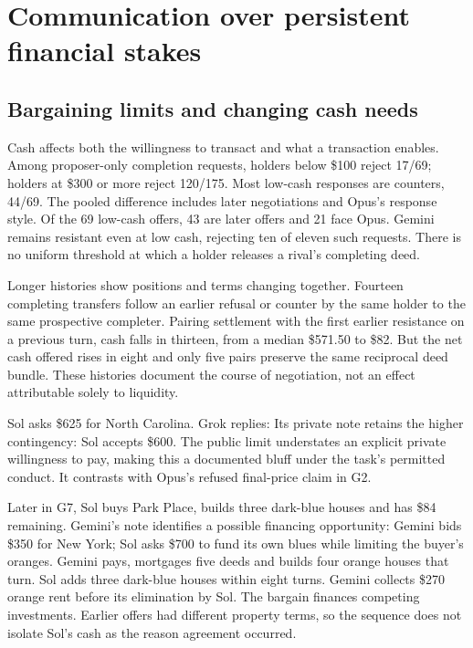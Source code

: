 \section{Communication over persistent financial stakes}
\label{sec:conduct}

\subsection{Bargaining limits and changing cash needs}
Cash affects both the willingness to transact and what a transaction enables. Among proposer-only completion requests, holders below \$100 reject 17/69; holders at \$300 or more reject 120/175. Most low-cash responses are counters, 44/69. The pooled difference includes later negotiations and Opus's response style. Of the 69 low-cash offers, 43 are later offers and 21 face Opus. Gemini remains resistant even at low cash, rejecting ten of eleven such requests. There is no uniform threshold at which a holder releases a rival's completing deed.

Longer histories show positions and terms changing together. Fourteen completing transfers follow an earlier refusal or counter by the same holder to the same prospective completer. Pairing settlement with the first earlier resistance on a previous turn, cash falls in thirteen, from a median \$571.50 to \$82. But the net cash offered rises in eight and only five pairs preserve the same reciprocal deed bundle. These histories document the course of negotiation, not an effect attributable solely to liquidity.

Sol asks \$625 for North Carolina. Grok replies:
Its private note retains the higher contingency:
Sol accepts \$600. The public limit understates an explicit private willingness to pay, making this a documented bluff under the task's permitted conduct. It contrasts with Opus's refused final-price claim in G2.

Later in G7, Sol buys Park Place, builds three dark-blue houses and has \$84 remaining. Gemini's note identifies a possible financing opportunity:
Gemini bids \$350 for New York; Sol asks \$700 to fund its own blues while limiting the buyer's oranges. Gemini pays, mortgages five deeds and builds four orange houses that turn. Sol adds three dark-blue houses within eight turns. Gemini collects \$270 orange rent before its elimination by Sol. The bargain finances competing investments. Earlier offers had different property terms, so the sequence does not isolate Sol's cash as the reason agreement occurred.

